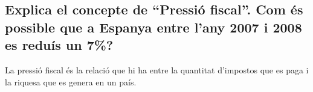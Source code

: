 \subsection{Explica el concepte de “Pressió fiscal”.
Com és possible que a Espanya entre l’any 2007 i 2008 es reduís un 7\%?}

La pressió fiscal és la relació que hi ha entre la quantitat d'impostos
que es paga i la riquesa que es genera en un país.
